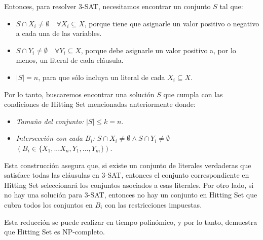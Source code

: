 \documentclass{estilo}
\begin{document}
Entonces, para resolver 3-SAT, necesitamos encontrar un conjunto \(S\) tal que:

\begin{itemize} 
    \item \(S \cap X_i \neq \emptyset \quad \forall X_i \subseteq X\), porque tiene que asignarle un valor positivo o negativo a cada una de las variables.
    \item \(S \cap Y_i \neq \emptyset \quad \forall Y_i \subseteq X\), porque debe asignarle un valor positivo a, por lo menos, un literal de cada cláusula.
    \item \(|S| = n\), para que sólo incluya un literal de cada $X_i \subseteq X$.
\end{itemize}

Por lo tanto, buscaremos encontrar una solución $S$ que cumpla con las condiciones de Hitting Set mencionadas anteriormente donde: 

\begin{itemize} 
    \item \textit{Tamaño del conjunto:} \quad $|S| \leq k = n$.
    \item \textit{Intersección con cada $B_i$:} \quad $S \cap X_i \neq \emptyset \land S \cap Y_i \neq \emptyset$ \quad $(B_i \in \{X_1, ... X_n, Y_1, ..., Y_m\})$.
\end{itemize}

Esta construcción asegura que, si existe un conjunto de literales verdaderas que satisface todas las cláusulas en 3-SAT, entonces el conjunto correspondiente en Hitting Set seleccionará los conjuntos asociados a esas literales. Por otro lado, si no hay una solución para 3-SAT, entonces no hay un conjunto en Hitting Set que cubra todos los conjuntos en $B_i$ con las restricciones impuestas.

Esta reducción se puede realizar en tiempo polinómico, y por lo tanto, demuestra que Hitting Set es NP-completo.
\end{document}
